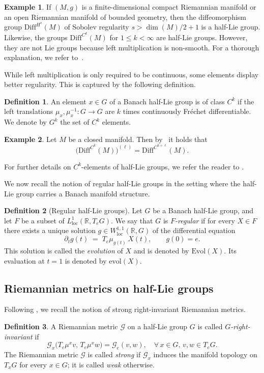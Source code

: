 \documentclass[11pt,reqno]{amsart}
\theoremstyle{plain}
\theoremstyle{definition}
\newtheorem{example}[thm]{Example}
\newtheorem{defn}[thm]{Definition}
\theoremstyle{plain} %
\theoremstyle{definition} %
\newtheorem{example}[example]{Example}
\newtheorem{defn}[defn]{Definition}
\numberwithin{equation}{section}
\def\RR{{\mathbb R}}
\begin{document}
\begin{example}\label{ex: sobolov lie group}
If $(M, g)$ is a finite-dimensional compact Riemannian manifold or an open Riemannian manifold of bounded geometry, 
then the diffeomorphism group $\mathrm{Diff}^{H^s}(M)$ of Sobolev regularity $s > \dim(M)/2 + 1$ is a half-Lie group. 
Likewise, the groups  $\mathrm{Diff}^{C^k}(M)$ for $1 \leq k < \infty$ 
are half-Lie groups. However, they are not Lie groups because left multiplication is non-smooth.
For a thorough explanation, we refer to~\cite{EM70}.
\end{example}

While left multiplication is only required to be continuous, some elements display better regularity. This is captured by the following definition.
\begin{defn}\label{Def: ck elements}
    An element \( x \in G \) of a Banach half-Lie group is of class \( C^k \) if the left translations \( \mu_x, \mu_x^{-1} \colon G \to G \) are \( k \) times continuously Fréchet differentiable. We denote by \( G^k \) the set of \( C^k \) elements.
\end{defn}

\begin{example}
\label{Ex:Diff_differentiable_elements}
Let $M$ be a closed manifold. Then by~\cite[Ex. 3.5]{Bauer_2025} it holds that
\[
\big(\mathrm{Diff}^{C^k}(M)\big)^{(\ell)} = \mathrm{Diff}^{C^{k+\ell}}(M).
\]
\end{example}
For further details on $C^k$-elements of half-Lie groups, we refer the reader to \cite[§§2–3]{Bauer_2025}. 

We now recall the notion of regular half-Lie groups in the setting where the half-Lie group carries a Banach manifold structure.
\begin{defn}[Regular half-Lie groups]\label{def:regular half Lie group}
Let $G$ be a Banach half-Lie group, and let $F$ be a subset of  $L^1_{\mathrm{loc}}(\RR, T_e G)$.  
We say that $G$ is \emph{$F$-regular} if for every $X \in F$ there exists a unique solution $ g \in W^{1,1}_{\mathrm{loc}}(\RR, G)$ of the differential equation
\[
    \partial_t g(t) \;=\; T_e \mu_{g(t)}\, X(t), 
    \qquad g(0) = e.
\]
This solution is called the \emph{evolution} of $X$ and is denoted by $\mathrm{Evol}(X)$. 
Its evaluation at $t=1$ is denoted by $\mathrm{evol}(X)$.
\end{defn}
\subsection{Riemannian metrics on half-Lie groups}
Following \cite{Bauer_2025}, we recall the notion of strong right-invariant Riemannian metrics.
\begin{defn}\label{Def: strong right invariant Riemannian metrics}
A Riemannian metric \( \mathcal{G} \) on a half-Lie group \( G \) is called 
\emph{$G$-right-invariant} if
\[
  \mathcal{G}_x\big( T_e \mu^x v,\, T_e \mu^x w \big)
  = \mathcal{G}_e(v, w),
  \quad \forall\, x \in G,\, v, w \in T_e G .
\]
The Riemannian metric \( \mathcal{G} \) is called \emph{strong} if 
\( \mathcal{G}_x \) induces the manifold topology on \( T_x G \) for every \( x \in G \); it is called \emph{weak} otherwise.
\end{defn}
\end{document}

